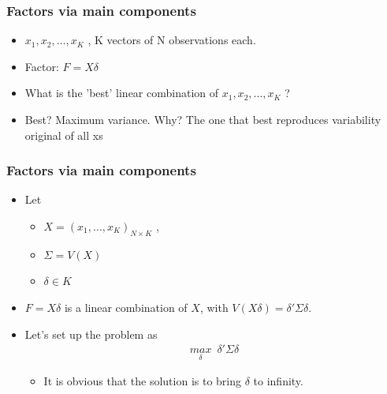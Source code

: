 \documentclass[
  shownotes,
  xcolor={svgnames},
  hyperref={colorlinks,citecolor=DarkBlue,linkcolor=DarkRed,urlcolor=DarkBlue}
  , aspectratio=169]{beamer}
\begin{document}
\begin{frame}
\frametitle{Factors via main components}

\begin{itemize}


\item $x_1, x_2, \dots, x_K$ , K vectors of N observations each.
\medskip
\item Factor: $F = X\delta$
\medskip
\item What is the 'best' linear combination of $x_1, x_2, \dots, x_K$ ?
\medskip
\item Best? Maximum variance. Why? The one that best reproduces variability original of all xs

\end{itemize}
\end{frame}
\begin{frame}
\frametitle{Factors via main components}

\begin{itemize}
  \item Let
  \begin{itemize}
    \item $X = (x_1 , \dots , x_K)_{N \times K}$  , 
    \item $\Sigma = V(X)$ 
    \item $\delta \in K$
 \end{itemize}
  \medskip
  \item $F = X\delta$ is a linear combination of $X$, with $V (X\delta) = \delta' \Sigma \delta$.
  \medskip
  \item Let's set up the problem as 
  \begin{align}
  \underset{\delta}{max}\,\,\, \delta' \Sigma \delta
  \end{align}
 \begin{itemize}
  \item It is obvious that the solution is to bring $\delta$ to infinity. 
 \end{itemize}
\end{itemize}
 \end{frame}
\end{document}
